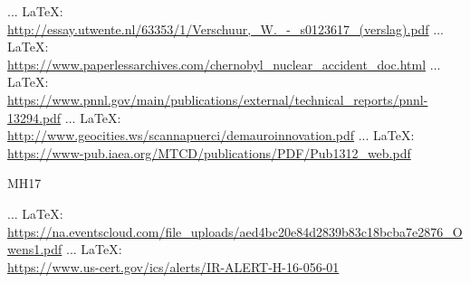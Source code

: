 \begin{thebibliography}{99}
{{{{{{{						%
						 ... \LaTeX:\\ \url{http://essay.utwente.nl/63353/1/Verschuur,_W._-_s0123617_(verslag).pdf}
						 ... \LaTeX:\\ \url{https://www.paperlessarchives.com/chernobyl_nuclear_accident_doc.html}
						 ... \LaTeX:\\ \url{https://www.pnnl.gov/main/publications/external/technical_reports/pnnl-13294.pdf}
						 ... \LaTeX:\\ \url{http://www.geocities.ws/scannapuerci/demauroinnovation.pdf}
						 ... \LaTeX:\\ \url{https://www-pub.iaea.org/MTCD/publications/PDF/Pub1312_web.pdf}
						
						
						
						
						MH17
						
						
						
						
						 ... \LaTeX:\\ \url{https://na.eventscloud.com/file_uploads/aed4bc20e84d2839b83c18bcba7e2876_Owens1.pdf}
						 ... \LaTeX:\\ \url{https://www.us-cert.gov/ics/alerts/IR-ALERT-H-16-056-01}
						
}}}}}}}
\end{thebibliography}
